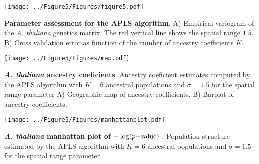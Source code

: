 \clearpage 
\newpage

\begin{center}
\texttt{[image: ../Figure5/Figures/figure5.pdf]}
\end{center}
 {\bf Parameter assessment for the APLS algorithm}. A) Empirical variogram of the {\it A. thaliana} genetics matrix. The red vertical line shows the spatial range $1.5$. B) Cross validation error as function of the number of ancestry coefficients $K$.

\clearpage 
\newpage

\begin{center}
\texttt{[image: ../Figure5/Figures/map.pdf]}
\end{center}
 {\bf {\it A. thaliana} ancestry coeficients}. Ancestry coeficient estimates computed by the APLS algorithm with $K=6$ ancestral populations and $\sigma = 1.5$ for the spatial range parameter A) Geographic map of ancestry coefficients. B) Barplot of ancestry coefficients.

\clearpage 
\newpage

\begin{center}
\texttt{[image: ../Figure5/Figures/manhattanplot.pdf]}
\end{center}
 {\bf {\it A.  thaliana} manhattan plot of $-\log(p{\rm -value})$ }. Population structure estimated by the APLS algorithm with $K=6$ ancestral populations and $\sigma = 1.5$ for the spatial range parameter.



